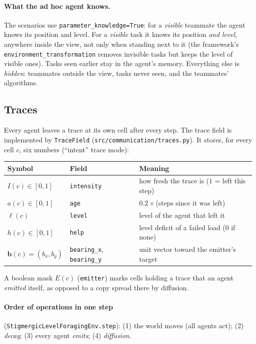\documentclass[11pt,a4paper]{article}
\newcommand{\file}{\nolinkurl}  %
\newcommand{\code}[1]{\texttt{#1}}
\theoremstyle{remark}
\begin{document}
\paragraph{What the ad hoc agent knows.} The scenarios use \code{parameter\_knowledge=True}: for a \emph{visible}
teammate the agent knows its position and level. For a \emph{visible} task it knows its position \emph{and level},
anywhere inside the view, not only when standing next to it (the framework's \code{environment\_transformation} removes
invisible tasks but keeps the level of visible ones). Tasks seen earlier stay in the agent's memory. Everything else is
\emph{hidden}: teammates outside the view, tasks never seen, and the teammates' algorithms.

\subsection{Traces}
\label{sec:traces}

Every agent leaves a trace at its own cell after every step. The trace field is implemented by \code{TraceField}
(\file{src/communication/traces.py}). It stores, for every cell $c$, six numbers (``intent'' trace mode):
\begin{center}
\begin{tabular}{lll}
\toprule
Symbol & Field & Meaning \\
\midrule
$I(c)\in[0,1]$ & \code{intensity} & how fresh the trace is ($1$ = left this step) \\
$a(c)\in[0,1]$ & \code{age} & $0.2\times$(steps since it was left) \\
$\ell(c)$ & \code{level} & level of the agent that left it \\
$h(c)\in[0,1]$ & \code{help} & level deficit of a failed load ($0$ if none) \\
$\mathbf b(c)=(b_x,b_y)$ & \code{bearing\_x}, \code{bearing\_y} & unit vector toward the emitter's target \\
\bottomrule
\end{tabular}
\end{center}
A boolean mask $E(c)$ (\code{emitter}) marks cells holding a trace that an agent \emph{emitted} itself, as opposed to a
copy spread there by diffusion.

\paragraph{Order of operations in one step} (\code{StigmergicLevelForagingEnv.step}): (1) the world moves (all agents
act); (2) \emph{decay}; (3) every agent \emph{emits}; (4) \emph{diffusion}.
\end{document}
